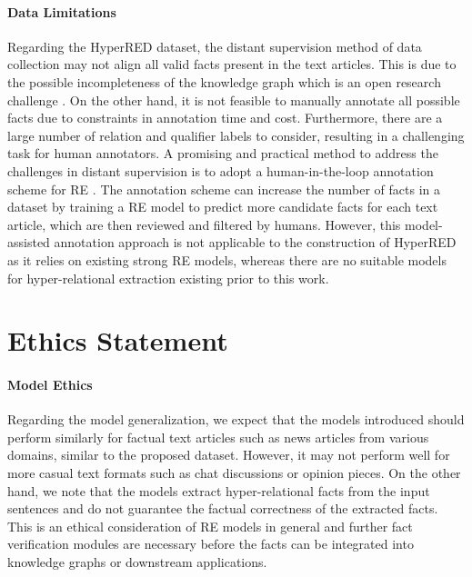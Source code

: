 \documentclass[11pt]{article}
\newcommand{\dataname}{HyperRED}
\begin{document}
\paragraph{Data Limitations} 
Regarding the \dataname{} dataset, the distant supervision method of data collection may not align all valid facts present in the text articles.
This is due to the possible incompleteness of the knowledge graph which is an open research challenge \citep{7358050}.
On the other hand, it is not feasible to manually annotate all possible facts due to constraints in annotation time and cost. 
Furthermore, there are a large number of relation and qualifier labels to consider, resulting in a challenging task for human annotators.
A promising and practical method to address the challenges in distant supervision is to adopt a human-in-the-loop annotation scheme for RE \citep{DBLP:journals/corr/abs-2205-12696}.
The annotation scheme can increase the number of facts in a dataset by training a RE model to predict more candidate facts for each text article, which are then reviewed and filtered by humans.
However, this model-assisted annotation approach is not applicable to the construction of \dataname{} as it relies on existing strong RE models, whereas there are no suitable models for hyper-relational extraction existing prior to this work.




\section*{Ethics Statement}
\paragraph{Model Ethics}
Regarding the model generalization, we expect that the models introduced should perform similarly for factual text articles such as news articles from various domains, similar to the proposed dataset.
However, it may not perform well for more casual text formats such as chat discussions or opinion pieces.
On the other hand, we note that the models extract hyper-relational facts from the input sentences and do not guarantee the factual correctness of the extracted facts.
This is an ethical consideration of RE models in general and further fact verification \citep{Nie_Chen_Bansal_2019} modules are necessary before the facts can be integrated into knowledge graphs or downstream applications.
\end{document}
